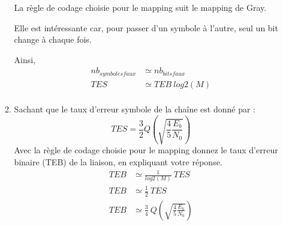 \documentclass[frenchb]{article}
\begin{document}
\begin{enumerate}
\begin{enumerate}
                    La règle de codage choisie pour le mapping suit le mapping de Gray. 
                    
                    Elle est intéressante car, pour passer d'un symbole à l'autre, seul un bit change à chaque fois.
                    
                    Ainsi, 
                    \begin{equation*}
                    \begin{split}
                    nb_{symboles faux} &\simeq nb_{bits faux} \\
                    TES & \simeq TEB \ log2(M)\\
                    \end{split}
                    \end{equation*}
                    \item Sachant que le taux d'erreur symbole de la chaîne est donné par :
                    $$
                    TES= \frac{3}{2}Q\left(\sqrt{\frac{4}{5}\frac{E_b}{N_0}}\right)
                    $$
                    Avec la règle de codage choisie pour le mapping donnez le taux d'erreur binaire (TEB) de la liaison, en expliquant votre réponse.
                    \begin{equation*}
                    \begin{split}
                    TEB & \simeq \frac{1}{log2(M)} \ TES\\
                    TEB & \simeq \frac{1}{2} \ TES\\
                    TEB & \simeq \frac{3}{4} \ Q\left(\sqrt{\frac{4}{5}\frac{E_b}{N_0}}\right)
                    \end{split}
                    \end{equation*}
                \end{enumerate}
    \end{enumerate}
\end{document}

